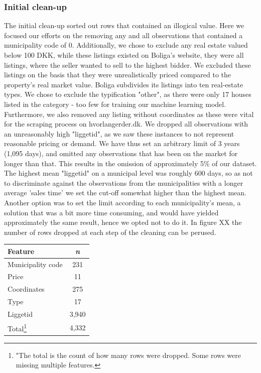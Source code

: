 \documentclass[12pt,a4paper]{article}
\begin{document}
\subsubsection{Initial clean-up}
The initial clean-up sorted out rows that contained an illogical value. Here we focused our efforts on the removing any and all observations that contained a municipality code of 0. Additionally, we chose to exclude any real estate valued below 100 DKK, while these listings existed on Boliga's website, they were all listings, where the seller wanted  to sell to the highest bidder. We excluded these listings on the basis that they were unrealistically priced compared to the property's real market value.\newline
Boliga subdivides its listings into ten real-estate types. We chose to exclude the typification "other", as there were only 17 houses listed in the category - too few for training our machine learning model. Furthermore, we also removed any listing without coordinates as these were vital for the scraping process on hvorlangerder.dk.\newline
We dropped all observations with an unreasonably high "liggetid", as we saw these instances to not  represent reasonable pricing or demand. We have thus set an arbitrary limit of 3 years (1,095 days), and omitted any observations that has been on the market for longer than that. This results in the omission of approximately 5\% of our dataset. The highest mean "liggetid" on a municipal level was roughly 600 days, so as not to discriminate against the observations from the municipalities with a longer average 'sales time' we set the cut-off somewhat higher than the highest mean. Another option was to set the limit according to each municipality's mean, a solution that was a bit more time consuming, and would have yielded approximately the same result, hence we opted not to do it.
In figure XX the number of rows dropped at each step of the cleaning can be perused.
\begin{center}
\begin{tabular}{|l|c|}
\hline 
Feature & \emph{n} \\
\hline 
Municipality code & 231 \\ 
\hline 
Price & 11 \\ 
\hline 
Coordinates & 275 \\ 
\hline 
Type & 17 \\ 
\hline 
Liggetid & 3,940\\
\hline 
Total\footnote{"The total is the count of how many rows were dropped. Some rows were missing multiple features.} & 4,332\\
\hline
\end{tabular} 
\end{center}
\end{document}
